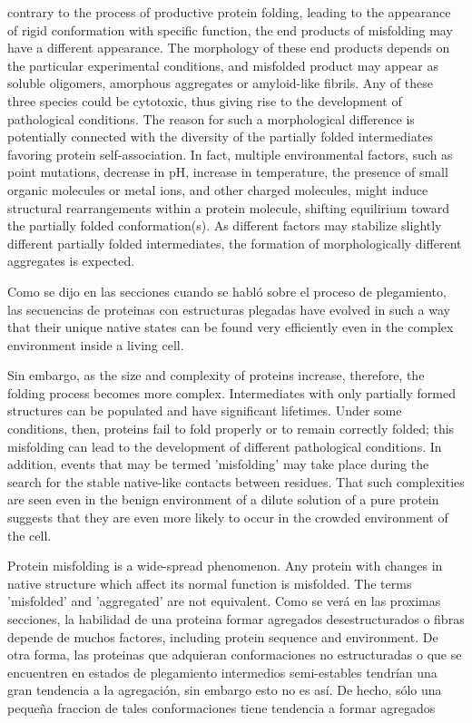 contrary to the process of productive protein folding, leading to the appearance of rigid conformation with specific function, the end products of misfolding may have a different appearance. 
The morphology of these end products depends on the particular experimental conditions, and misfolded product may appear as soluble oligomers, amorphous aggregates or amyloid-like fibrils. 
Any of these three species could be cytotoxic, thus giving rise to the development of pathological conditions. 
The reason for such a morphological difference is potentially connected with the diversity of the partially folded intermediates favoring protein self-association. 
In fact, multiple environmental factors, such as point mutations, decrease in pH, increase in temperature, the presence of small organic molecules or metal ions, and other charged molecules, might induce structural rearrangements within a protein molecule, shifting equilirium toward the partially folded conformation(s). As different factors may stabilize slightly different partially folded intermediates, the formation of morphologically
different aggregates is expected.


Como se dijo en las secciones cuando se habló sobre el proceso de plegamiento, las secuencias de proteinas con estructuras plegadas have evolved in such a way that their unique native states 
can be found very efficiently even in the complex environment inside a living cell.

Sin embargo, as the size and complexity of proteins increase, therefore, the folding process becomes more complex. 
Intermediates with only partially formed structures can be populated and have significant lifetimes. 
Under some conditions, then, proteins fail to fold properly or to remain correctly folded; this misfolding can lead to the development of different pathological conditions.
In addition, events that may be termed 'misfolding' may take place during the search for the stable native-like contacts between residues. 
That such complexities are seen even in the benign environment of a dilute solution of a pure protein suggests that they are even more likely to occur in the crowded environment of the cell.

Protein misfolding is a wide-spread phenomenon. Any protein with changes in native structure which affect its normal function is misfolded. 
The terms 'misfolded' and 'aggregated' are not equivalent. Como se verá en las proximas secciones, la habilidad de una proteina formar agregados desestructurados o fibras depende de muchos factores, including protein sequence and environment.
De otra forma, las proteinas que adquieran conformaciones no estructuradas o que se encuentren en estados de plegamiento intermedios semi-estables tendrían una gran tendencia a la agregación, sin embargo esto no es así. 
De hecho, sólo una pequeña fraccion de tales conformaciones tiene tendencia a formar agregados







